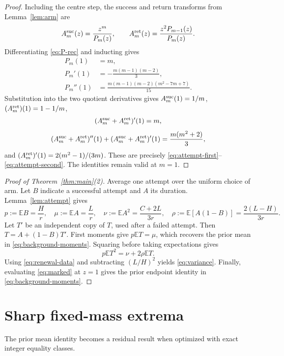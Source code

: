 \documentclass[a4paper,10pt]{amsart}
\theoremstyle{remark}
\newcommand{\E}{\mathbb E}
\begin{document}
\begin{proof}
Including the centre step, the success and return transforms from
Lemma~\ref{lem:arm} are
\[
 A_m^{\rm suc}(z)=\frac{z^m}{P_m(z)},\qquad
 A_m^{\rm ret}(z)=\frac{z^2P_{m-1}(z)}{P_m(z)}.
\]
Differentiating \eqref{eq:P-rec} and inducting gives
\begin{align*}
 P_m(1)&=m,\\
 P_m'(1)&=-\frac{m(m-1)(m-2)}3,\\
 P_m''(1)&=\frac{m(m-1)(m-2)(m^2-7m+7)}{15}.
\end{align*}
Substitution into the two quotient derivatives gives
$A_m^{\rm suc}(1)=1/m$, $(A_m^{\rm ret})(1)=1-1/m$,
\[
 (A_m^{\rm suc}+A_m^{\rm ret})'(1)=m,
 \]
\[
 (A_m^{\rm suc}+A_m^{\rm ret})''(1)
 +(A_m^{\rm suc}+A_m^{\rm ret})'(1)=\frac{m(m^2+2)}3,
\]
and $(A_m^{\rm ret})'(1)=2(m^2-1)/(3m)$.  These are precisely
\eqref{eq:attempt-first}--\eqref{eq:attempt-second}.  The identities remain
valid at $m=1$.
\end{proof}

\begin{proof}[Proof of Theorem~\ref{thm:main}(2)]
Average one attempt over the uniform choice of arm.  Let $B$ indicate a
successful attempt and $A$ its duration.  Lemma~\ref{lem:attempt} gives
\begin{equation}\label{eq:renewal-data}
 p:=\E B=\frac Hr,\quad
 \mu:=\E A=\frac Lr,\quad
 \nu:=\E A^2=\frac{C+2L}{3r},\quad
 \rho:=\E[A(1-B)]=\frac{2(L-H)}{3r}.
\end{equation}
Let $T'$ be an independent copy of $T$, used after a failed attempt.  Then
$T=A+(1-B)T'$.  First moments give $p\E T=\mu$, which recovers the prior mean
in \eqref{eq:background-moments}.  Squaring before taking expectations gives
\[
 p\E T^2=\nu+2\rho\E T.
\]
Using \eqref{eq:renewal-data} and subtracting $(L/H)^2$ yields
\eqref{eq:variance}.  Finally, evaluating \eqref{eq:marked} at $z=1$ gives
the prior endpoint identity in \eqref{eq:background-moments}.
\end{proof}

\section{Sharp fixed-mass extrema}\label{sec:extrema}

The prior mean identity becomes a residual result when optimized with exact
integer equality classes.
\end{document}

